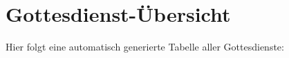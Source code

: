 \documentclass[a4paper,12pt]{article}
\begin{document}
\section*{Gottesdienst-Übersicht}

Hier folgt eine automatisch generierte Tabelle aller Gottesdienste:

\bigskip

\end{document}
